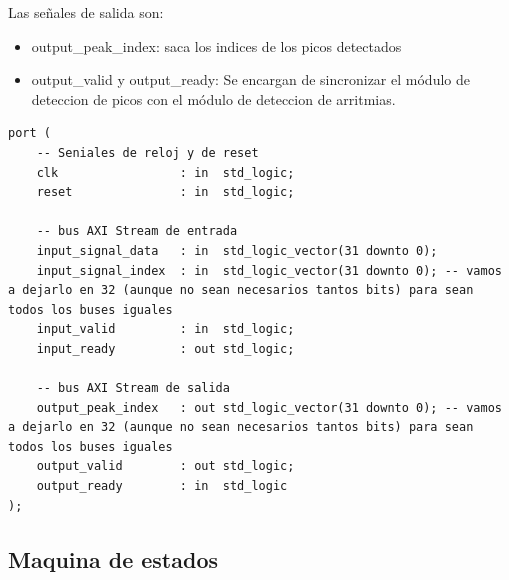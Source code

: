     Las señales de salida son:
    
    \begin{itemize}
        \item output\_peak\_index: saca los indices de los picos detectados
        \item output\_valid y output\_ready: Se encargan de sincronizar el módulo de deteccion de picos 
        con el módulo de deteccion de arritmias.
    \end{itemize}

        
\lstset{language=VHDL, breaklines=true, basicstyle=\footnotesize}
\begin{lstlisting}[frame=single] 
port (
    -- Seniales de reloj y de reset
    clk                 : in  std_logic;
    reset               : in  std_logic; 
    
    -- bus AXI Stream de entrada
    input_signal_data   : in  std_logic_vector(31 downto 0);
    input_signal_index  : in  std_logic_vector(31 downto 0); -- vamos a dejarlo en 32 (aunque no sean necesarios tantos bits) para sean todos los buses iguales
    input_valid         : in  std_logic;
    input_ready         : out std_logic;
    
    -- bus AXI Stream de salida
    output_peak_index   : out std_logic_vector(31 downto 0); -- vamos a dejarlo en 32 (aunque no sean necesarios tantos bits) para sean todos los buses iguales
    output_valid        : out std_logic;
    output_ready        : in  std_logic   
);
\end{lstlisting}
\subsection{Maquina de estados}


